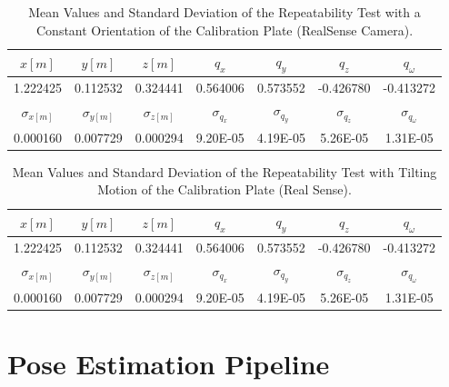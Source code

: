 \begin{table}[ht]
\renewcommand{\arraystretch}{1.3}
\caption{Mean Values and Standard Deviation of the Repeatability Test with a Constant Orientation of the Calibration Plate (RealSense Camera).}
\label{meanreal1}
\centering
\begin{tabular}{|c||c||c||c||c||c||c|}
\hline
$x[m]$ & $y[m]$ & $z[m]$ & $q_{x}$ & $q_{y}$ & $q_{z}$ &$q_{\omega}$ \\
\hline
1.222425&	0.112532&	0.324441&0.564006&	0.573552&	-0.426780&	-0.413272 \\
\hline
\hline
$\sigma_{x[m]}$ & $\sigma_{y[m]}$ & $\sigma_{z[m]}$ & $\sigma_{q_{x}}$ & $\sigma_{q_{y}}$ & $\sigma_{q_{z}}$ &$\sigma_{q_{\omega}}$ \\
\hline
0.000160&	0.007729&	0.000294&9.20E-05&	4.19E-05&	5.26E-05&	1.31E-05\\
\hline
\end{tabular}
\end{table}




\begin{table}[ht]
\renewcommand{\arraystretch}{1.3}
\caption{Mean Values and Standard Deviation  of the Repeatability Test with Tilting Motion of the Calibration Plate (Real Sense).}
\label{meanreal2}
\centering
\begin{tabular}{|c||c||c||c||c||c||c|}
\hline
$x[m]$ & $y[m]$ & $z[m]$ & $q_{x}$ & $q_{y}$ & $q_{z}$ &$q_{\omega}$ \\
\hline
1.222425&	0.112532&	0.324441&0.564006&	0.573552&	-0.426780&	-0.413272  \\
\hline
\hline
$\sigma_{x[m]}$ & $\sigma_{y[m]}$ & $\sigma_{z[m]}$ & $\sigma_{q_{x}}$ & $\sigma_{q_{y}}$ & $\sigma_{q_{z}}$ &$\sigma_{q_{\omega}}$ \\
\hline
0.000160&	0.007729&	0.000294&9.20E-05&	4.19E-05&	5.26E-05&	1.31E-05\\
\hline
\end{tabular}
\end{table}


\section{Pose Estimation Pipeline}

